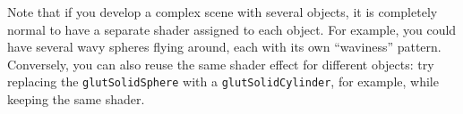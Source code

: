 \documentclass{article}
\begin{document}
Note that if you develop a complex scene with several objects, it is completely normal to have a separate shader assigned to each object. For example, you could have several wavy spheres flying around, each with its own ``waviness'' pattern. Conversely, you can also reuse the same shader effect for different objects: try replacing the \verb#glutSolidSphere# with a \verb#glutSolidCylinder#, for example, while keeping the same shader.
\end{document}
